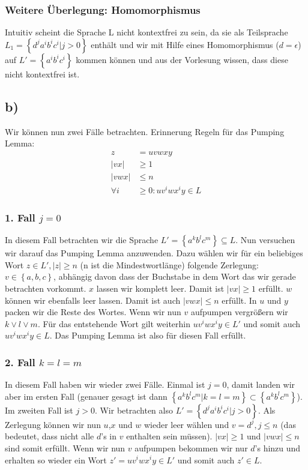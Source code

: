 \documentclass{article}
\begin{document}
\subsubsection*{Weitere Überlegung: Homomorphismus}
Intuitiv scheint die Sprache L nicht kontextfrei zu sein, da sie als Teilsprache $L_1=\left\{d^ja^ib^ic^i | j > 0 \right\}$ enthält und wir mit Hilfe eines Homomorphismus ($d=\epsilon$) auf $L'=\left\{a^ib^ic^i\right\}$ kommen können und aus der Vorlesung wissen, dass diese nicht kontextfrei ist.


\subsection*{b)}
Wir können nun zwei Fälle betrachten. Erinnerung Regeln für das Pumping Lemma:
\begin{align*}
z &= uvwxy \\
|vx| &\geq 1\\
|vwx| &\leq n \\
\forall i &\geq 0: uv^iwx^iy\in L 
\end{align*}

\subsubsection*{1. Fall $j=0$}
In diesem Fall betrachten wir die Sprache $L'=\left\{a^kb^lc^m\right\} \subseteq L$. Nun versuchen wir darauf das Pumping Lemma anzuwenden. Dazu wählen wir für ein beliebiges Wort $z\in L',|z|\geq n$ (n ist die Mindestwortlänge) folgende Zerlegung: $v\in \left\{a,b,c\right\}$, abhängig davon dass der Buchstabe in dem Wort das wir gerade betrachten vorkommt. $x$ lassen wir komplett leer. Damit ist $|vx| \geq 1$ erfüllt. $w$ können wir ebenfalls leer lassen. Damit ist auch $|vwx| \leq n$ erfüllt. In $u$ und $y$ packen wir die Reste des Wortes. Wenn wir nun $v$ aufpumpen vergrößern wir $k \vee l \vee m$. Für das entstehende Wort gilt weiterhin $uv^iwx^iy \in L'$ und somit auch $uv^iwx^iy \in L$. Das Pumping Lemma ist also für diesen Fall erfüllt.

\subsubsection*{2. Fall $k=l=m$}
In diesem Fall haben wir wieder zwei Fälle. Einmal ist $j=0$, damit landen wir aber im ersten Fall (genauer gesagt ist dann $\left\{a^kb^lc^m|k=l=m\right\} \subset \left\{a^kb^lc^m\right\}$). Im zweiten Fall ist $j>0$. Wir betrachten also $L'=\left\{d^ja^ib^ic^i|j>0\right\}$. Als Zerlegung können wir nun $u$,$x$ und $w$ wieder leer wählen und $v=d^j, j\leq n$ (das bedeutet, dass nicht alle $d$'s in $v$ enthalten sein müssen). $|vx| \geq 1$ und $|vwx| \leq n$ sind somit erfüllt. Wenn wir nun $v$ aufpumpen bekommen wir nur $d$'s hinzu und erhalten so wieder ein Wort $z' = uv^iwx^iy \in L'$ und somit auch $z' \in L$.
\end{document}
